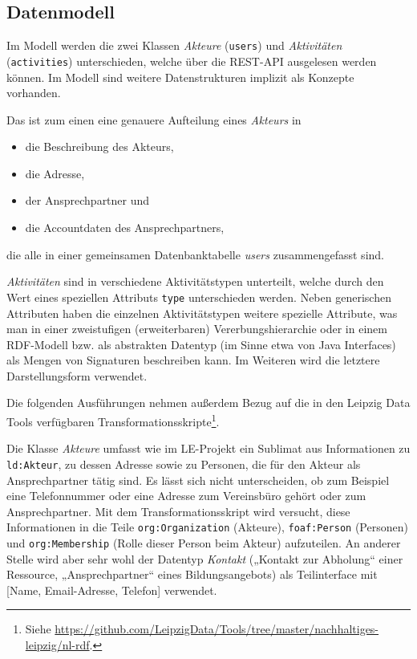 \documentclass[a4paper,11pt]{article}
\begin{document}
\subsection{Datenmodell}

Im Modell werden die zwei Klassen \emph{Akteure} (\texttt{users}) und
\emph{Aktivitäten} (\texttt{activities}) unterschieden, welche über die
REST-API ausgelesen werden können.  Im Modell sind weitere Datenstrukturen
implizit als Konzepte vorhanden.

Das ist zum einen eine genauere Aufteilung eines \emph{Akteurs} in
\begin{itemize}
\item die Beschreibung des Akteurs,
\item die Adresse,
\item der Ansprechpartner und
\item die Accountdaten des Ansprechpartners,
\end{itemize}
die alle in einer gemeinsamen Datenbanktabelle \emph{users} zusammengefasst
sind.

\emph{Aktivitäten} sind in verschiedene Aktivitätstypen unterteilt, welche
durch den Wert eines speziellen Attributs \texttt{type} unterschieden werden.
Neben generischen Attributen haben die einzelnen Aktivitätstypen weitere
spezielle Attribute, was man in einer zweistufigen (erweiterbaren)
Vererbungshierarchie oder in einem RDF-Modell bzw. als abstrakten Datentyp (im
Sinne etwa von Java Interfaces) als Mengen von Signaturen beschreiben kann.
Im Weiteren wird die letztere Darstellungsform verwendet. 

Die folgenden Ausführungen nehmen außerdem Bezug auf die in den Leipzig
Data Tools verfügbaren Transformationsskripte\footnote{Siehe
  \url{https://github.com/LeipzigData/Tools/tree/master/nachhaltiges-leipzig/nl-rdf}.}.

Die Klasse \emph{Akteure} umfasst wie im LE-Projekt ein Sublimat aus
Informationen zu \texttt{ld:Akteur}, zu dessen Adresse sowie zu Personen, die
für den Akteur als Ansprechpartner tätig sind.  Es lässt sich nicht
unterscheiden, ob zum Beispiel eine Telefonnummer oder eine Adresse zum
Vereinsbüro gehört oder zum Ansprechpartner.  Mit dem Transformationsskript
wird versucht, diese Informationen in die Teile \texttt{org:Organization}
(Akteure), \texttt{foaf:Person} (Personen) und \texttt{org:Membership} (Rolle
dieser Person beim Akteur) aufzuteilen.  An anderer Stelle wird aber sehr wohl
der Datentyp \emph{Kontakt} („Kontakt zur Abholung“ einer Ressource,
„Ansprechpartner“ eines Bildungsangebots) als Teilinterface mit [Name,
  Email-Adresse, Telefon] verwendet.   
\end{document}
